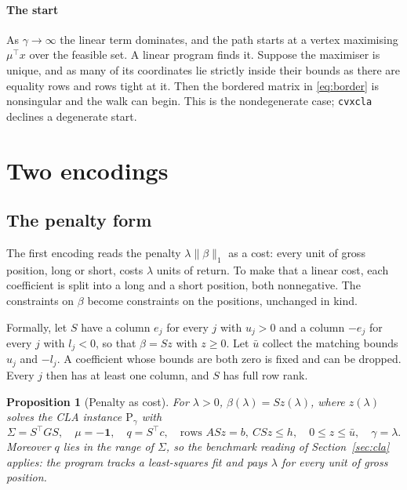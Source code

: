 \documentclass[11pt]{article}
\newtheorem{proposition}{Proposition}
\theoremstyle{remark}
\newcommand{\trans}{^{\top}}
\newcommand{\Sig}{\Sigma}
\newcommand{\one}{\mathbf{1}}
\begin{document}
\paragraph{The start} As $\gamma\to\infty$ the linear term dominates, and the path
starts at a vertex maximising $\mu\trans x$ over the feasible set. A linear program
finds it. Suppose the maximiser is unique, and as many of its coordinates lie strictly
inside their bounds as there are equality rows and rows tight at it. Then the bordered
matrix in \eqref{eq:border} is nonsingular and the walk can begin. This is the
nondegenerate case; \texttt{cvxcla} declines a degenerate start.

\section{Two encodings}
\label{sec:encodings}

\subsection{The penalty form}
\label{sec:penalty}

The first encoding reads the penalty $\lambda\|\beta\|_1$ as a cost: every unit of
gross position, long or short, costs $\lambda$ units of return. To make that a linear
cost, each coefficient is split into a long and a short position, both nonnegative.
The constraints on $\beta$ become constraints on the positions, unchanged in kind.

Formally, let $S$ have a column $e_j$ for every $j$ with $u_j>0$ and a column $-e_j$
for every $j$ with $l_j<0$, so that $\beta=Sz$ with $z\ge0$. Let $\bar u$ collect the
matching bounds $u_j$ and $-l_j$. A coefficient whose bounds are both zero is fixed and
can be dropped. Every $j$ then has at least one column, and $S$ has full row rank.

\begin{proposition}[Penalty as cost]
\label{prop:penalty}
For $\lambda>0$, $\beta(\lambda)=Sz(\lambda)$, where $z(\lambda)$ solves the CLA
instance $\mathrm{P}_\gamma$ with
\[
\Sig=S\trans GS,\quad \mu=-\one,\quad q=S\trans c,\quad
\text{rows } ASz=b,\ CSz\le h,\quad 0\le z\le\bar u,\quad \gamma=\lambda .
\]
Moreover $q$ lies in the range of $\Sig$, so the benchmark reading of
Section~\ref{sec:cla} applies: the program tracks a least-squares fit and pays
$\lambda$ for every unit of gross position.
\end{proposition}
\end{document}
